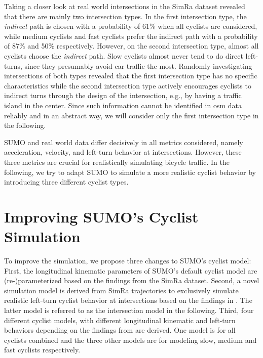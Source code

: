 Taking a closer look at real world intersections in the SimRa dataset revealed that there are mainly two intersection types.
In the first intersection type, the \textit{indirect} path is chosen with a probability of \num{61}\% when all cyclists are considered, while medium cyclists and fast cyclists prefer the indirect path with a probability of \num{87}\% and \num{50}\% respectively.
However, on the second intersection type, almost all cyclists choose the \textit{indirect} path.
Slow cyclists almost never tend to do direct left-turns, since they presumably avoid car traffic the most.
Randomly investigating intersections of both types revealed that the first intersection type has no specific characteristics while the second intersection type actively encourages cyclists to indirect turns through the design of the intersection, e.g., by having a traffic island in the center.
Since such information cannot be identified in \ac{osm} data reliably and in an abstract way, we will consider only the first intersection type in the following.

SUMO and real world data differ decisively in all metrics considered, namely acceleration, velocity, and left-turn behavior at intersections.
However, these three metrics are crucial for realistically simulating bicycle traffic.
In the following, we try to adapt SUMO to simulate a more realistic cyclist behavior by introducing three different cyclist types.


\section{Improving SUMO's Cyclist Simulation}
\label{sec:improving_sumos_bicycle_simulation}
To improve the simulation, we propose three changes to SUMO's cyclist model:
First, the longitudinal kinematic parameters of SUMO's default cyclist model are \mbox{(re-)}parameterized based on the findings from the SimRa dataset.
Second, a novel simulation model is derived from SimRa trajectories to exclusively simulate realistic left-turn cyclist behavior at intersections based on the findings in .
The latter model is referred to as the intersection model in the following.
Third, four different cyclist models, with different longitudinal kinematic and left-turn behaviors depending on the findings from  are derived.
One model is for all cyclists combined and the three other models are for modeling slow, medium and fast cyclists respectively.


